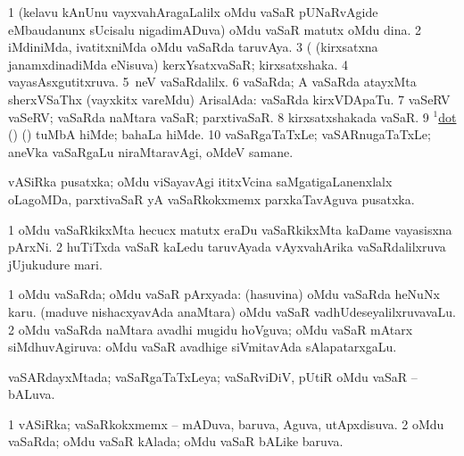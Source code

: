 \noindent
\gl{\pagu}
\bmng
\bnum
\num{1}  (kelavu kAnUnu vayxvahAragaLalilx oMdu vaSaR  pUNaRvAgide eMbaudanunx sUcisalu nigadimADuva) oMdu vaSaR matutx oMdu dina. 
\num{2}  iMdiniMda, ivatitxniMda oMdu vaSaRda taruvAya. 
\num{3}  (  (kirxsatxna janamxdinadiMda eNisuva) kerxYsatxvaSaR; kirxsatxshaka.  
\num{4}  vayasAsxgutitxruva.  
\num{5}  \kirxsha \eng{$\ldots$}\,neV vaSaRdalilx.  
\num{6}  vaSaRda; A vaSaRda atayxMta sherxVSaThx (vayxkitx \mo vareMdu) ArisalAda:  vaSaRda kirxVDApaTu. 
\num{7}  vaSeRV vaSeRV; vaSaRda naMtara vaSaR; parxtivaSaR.  
\num{8}  kirxsatxshakada vaSaR.  
\num{9}  \hyperref{kandict_d.pdf}{D}{dot(1) nuga(3)}{$^1$dot} (\birx) (\AmA) tuMbA hiMde; bahaLa hiMde.
\num{10}  vaSaRgaTaTxLe; vaSARnugaTaTxLe; aneVka vaSaRgaLu niraMtaravAgi, oMdeV samane.
\enum
\emng 
\eentry

\bentry
{} 
\gl{\nA} 
\bmng
vASiRka pusatxka; oMdu viSayavAgi ititxVcina saMgatigaLanenxlalx oLagoMDa, parxtivaSaR yA vaSaRkokxmemx  parxkaTavAguva pusatxka.
\emng
\eentry

\bentry
{} 
\gl{\nA} 
\bmng
\bnum
\num{1} oMdu vaSaRkikxMta hecucx matutx eraDu vaSaRkikxMta kaDame vayasisxna pArxNi. 
\num{2} huTiTxda vaSaR kaLedu taruvAyada vAyxvahArika vaSaRdalilxruva jUjukudure mari.
\enum
\emng
\eentry

\bentry
{} 
\gl{\gu} 
\bmng
\bnum
\num{1} oMdu vaSaRda; oMdu vaSaR pArxyada:  (hasuvina) oMdu vaSaRda heNuNx karu.  (maduve nishacxyavAda anaMtara) oMdu vaSaR vadhUdeseyalilxruvavaLu. 
\num{2} oMdu vaSaRda naMtara avadhi mugidu hoVguva; oMdu vaSaR mAtarx siMdhuvAgiruva:  oMdu vaSaR avadhige siVmitavAda sAlapatarxgaLu.
\enum
\emng
\eentry


\bentry
{} 
\gl{\gu} 
\bmng
vaSARdayxMtada; vaSaRgaTaTxLeya; vaSaRviDiV, pUtiR oMdu vaSaR -- bALuva.
\emng
\eentry

\bentry
{} 
\gl{\gu} 
\bmng
\bnum
\num{1} vASiRka; vaSaRkokxmemx -- mADuva, baruva, Aguva, utApxdisuva. 
\num{2} oMdu vaSaRda; oMdu vaSaR kAlada; oMdu vaSaR bALike baruva.
\enum
\emng
\eentry

